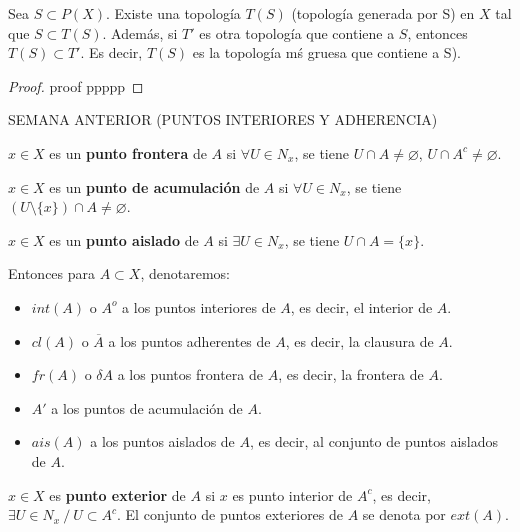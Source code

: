 \begin{nprop}
  Sea $S \subset P(X)$. Existe una topología $T(S)$ (topología generada por S) en $X$ tal que $S \subset T(S)$. Además, si $T'$ es otra topología que contiene a $S$, entonces $T(S) \subset T'$. Es decir, $T(S)$ es la topología mś gruesa que contiene a S).
\end{nprop}
\begin{proof}
  proof
  ppppp
\end{proof}

SEMANA ANTERIOR (PUNTOS INTERIORES Y ADHERENCIA)

\begin{ndef}
  $x \in X$ es un \textbf{punto frontera} de $A$ si $\forall U \in N_x$, se tiene $U \cap A \neq \varnothing $, $U \cap A^c \neq \varnothing $.
\end{ndef}
\begin{ndef}
  $x \in X$ es un \textbf{punto de acumulación} de $A$ si $\forall U \in N_x$, se tiene $(U\setminus \{x\}) \cap A \neq \varnothing $.
\end{ndef}
\begin{ndef}
  $x \in X$ es un \textbf{punto aislado} de $A$ si $\exists U \in N_x$, se tiene $U \cap A = \{x\} $.
\end{ndef}

Entonces para $A \subset X$, denotaremos:
\begin{itemize}
  \item $int(A)$ o $A^o$ a los puntos interiores de $A$, es decir, el interior de $A$.
  \item $cl(A)$ o $\overline{A}$ a los puntos adherentes de $A$, es decir, la clausura de $A$.
  \item $fr(A)$ o $\delta A$ a los puntos frontera de $A$, es decir, la frontera de $A$.
  \item $A'$ a los puntos de acumulación de $A$.
  \item $ais(A)$ a los puntos aislados de $A$, es decir, al conjunto de puntos aislados de $A$.
\end{itemize}

\begin{ndef}
  $x \in X$ es \textbf{punto exterior} de $A$ si $x$ es punto interior de $A^c$, es decir, $\exists U \in N_x\ /\ U \subset A^c$. El conjunto de puntos exteriores de $A$ se denota por $ext(A)$.
\end{ndef}


